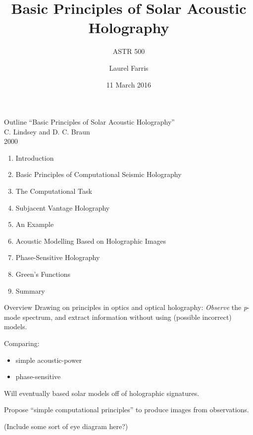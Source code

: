 \documentclass{beamer}
\title{Basic Principles of Solar Acoustic Holography}
\subtitle{ASTR 500}
\date{11 March 2016}
\author{Laurel Farris}
\begin{document}
\begin{frame}
    \titlepage
\end{frame}

\begin{frame}{Outline}
``Basic Principles of Solar Acoustic Holography''\\
C. Lindsey and D. C. Braun\\
2000
    \begin{enumerate}
        \item Introduction
        \item Basic Principles of Computational Seismic Holography
        \item The Computational Task
        \item Subjacent Vantage Holography
        \item An Example
        \item Acoustic Modelling Based on Holographic Images
        \item Phase-Sensitive Holography
        \item Green's Functions
        \item Summary
    \end{enumerate}
\end{frame}

\begin{frame}{Overview}
    Drawing on principles in optics and optical holography:
    \emph{Observe} the \emph{p}-mode spectrum, and extract
    information without using (possible incorrect) models.

    Comparing:
    \begin{itemize}
        \item simple acoustic-power
        \item phase-sensitive
    \end{itemize}
    Will eventually based solar models off of holographic signatures.

    Propose ``simple computational principles'' to produce images
    from observations.
    
    (Include some sort of eye diagram here?)

\end{frame}
\end{document}
